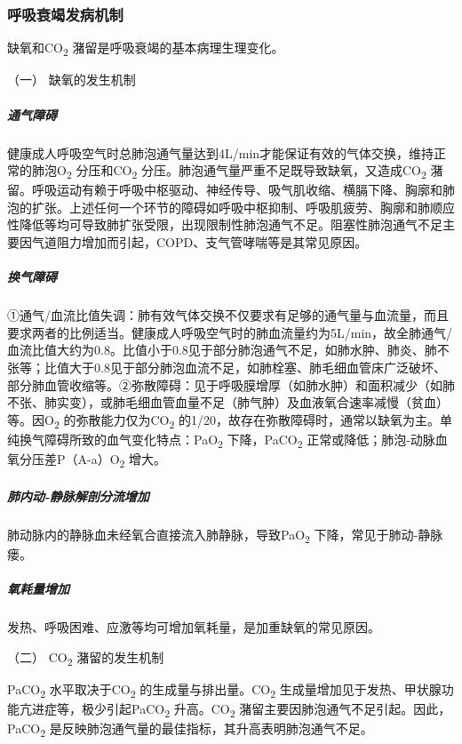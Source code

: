 \subsubsection{呼吸衰竭发病机制}

缺氧和CO\textsubscript{2} 潴留是呼吸衰竭的基本病理生理变化。

\hypertarget{text00076.htmlux5cux23CHP3-4-1-3-1}{}
（一） 缺氧的发生机制

\subparagraph{通气障碍}

健康成人呼吸空气时总肺泡通气量达到4L/min才能保证有效的气体交换，维持正常的肺泡O\textsubscript{2}
分压和CO\textsubscript{2}
分压。肺泡通气量严重不足既导致缺氧，又造成CO\textsubscript{2}
潴留。呼吸运动有赖于呼吸中枢驱动、神经传导、吸气肌收缩、横膈下降、胸廓和肺泡的扩张。上述任何一个环节的障碍如呼吸中枢抑制、呼吸肌疲劳、胸廓和肺顺应性降低等均可导致肺扩张受限，出现限制性肺泡通气不足。阻塞性肺泡通气不足主要因气道阻力增加而引起，COPD、支气管哮喘等是其常见原因。

\subparagraph{换气障碍}

①通气/血流比值失调：肺有效气体交换不仅要求有足够的通气量与血流量，而且要求两者的比例适当。健康成人呼吸空气时的肺血流量约为5L/min，故全肺通气/血流比值大约为0.8。比值小于0.8见于部分肺泡通气不足，如肺水肿、肺炎、肺不张等；比值大于0.8见于部分肺泡血流不足，如肺栓塞、肺毛细血管床广泛破坏、部分肺血管收缩等。②弥散障碍：见于呼吸膜增厚（如肺水肿）和面积减少（如肺不张、肺实变），或肺毛细血管血量不足（肺气肿）及血液氧合速率减慢（贫血）等。因O\textsubscript{2}
的弥散能力仅为CO\textsubscript{2}
的1/20，故存在弥散障碍时，通常以缺氧为主。单纯换气障碍所致的血气变化特点：PaO\textsubscript{2}
下降，PaCO\textsubscript{2}
正常或降低；肺泡-动脉血氧分压差P（A-a）O\textsubscript{2} 增大。

\subparagraph{肺内动-静脉解剖分流增加}

肺动脉内的静脉血未经氧合直接流入肺静脉，导致PaO\textsubscript{2}
下降，常见于肺动-静脉瘘。

\subparagraph{氧耗量增加}

发热、呼吸困难、应激等均可增加氧耗量，是加重缺氧的常见原因。

\hypertarget{text00076.htmlux5cux23CHP3-4-1-3-2}{}
（二） CO\textsubscript{2} 潴留的发生机制

PaCO\textsubscript{2} 水平取决于CO\textsubscript{2}
的生成量与排出量。CO\textsubscript{2}
生成量增加见于发热、甲状腺功能亢进症等，极少引起PaCO\textsubscript{2}
升高。CO\textsubscript{2}
潴留主要因肺泡通气不足引起。因此，PaCO\textsubscript{2}
是反映肺泡通气量的最佳指标，其升高表明肺泡通气不足。

